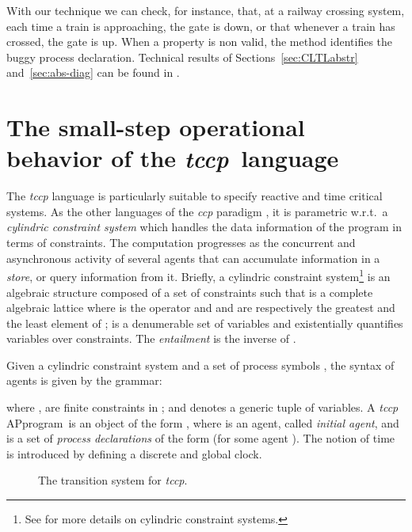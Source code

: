 \documentclass[american]{new_tlp}
\makeatletter
\providecommand{\ifempty}[3]{\def\@@@temp{#1}\ifx\@@@temp\@empty#2\else#3\fi}
\newcommand*{\ccp}{\textit{ccp}}
\newcommand*{\progrule}{process declaration}
\newcommand*{\query}[1][A]{\ifempty{#1}{P}{p}rogram}
\newcommand*{\tccp}{\textit{tccp}}
\providecommand*{\wrt}  {w.r.t.}
\makeatother
\begin{document}
With our technique we can check, for instance, that, at a railway crossing
system, each time a train is approaching, the gate is down, or that
whenever a train has crossed, the gate is up.  When a property is non
valid, the method identifies the buggy \progrule.  Technical results of
Sections~\ref{sec:CLTLabstr} and~\ref{sec:abs-diag} can be found in
\cite{CominiTV14-techrep}.


\section{The small-step operational behavior of the \tccp\ language}
\label{sec:Sem}

The \tccp{} language \cite{deBoerGM99} is particularly suitable to specify
reactive and time critical systems.  As the other languages of the \ccp{}
paradigm \cite{Saraswat93}, it is parametric \wrt\ a \emph{cylindric
constraint system} which handles the data information of the program in
terms of constraints.  The computation progresses as the concurrent and
asynchronous activity of several agents that can accumulate information in
a \emph{store}, or query information from it.  Briefly, a cylindric
constraint system\footnote{See \cite{deBoerGM99,Saraswat93} for more
details on cylindric constraint systems.} is an algebraic structure  composed of a set of constraints
 such that  is a complete algebraic lattice
where  is the  operator and  and  are
respectively the greatest and the least element of ;  is a
denumerable set of variables and  existentially quantifies
variables over constraints.  The \emph{entailment}  is the inverse
of .


Given a cylindric constraint system  and a set of process symbols
, the syntax of agents is given by the grammar:

where ,  are finite constraints in ; 
and  denotes a generic tuple of  variables.  A \tccp{} \query\
is an object of the form , where  is an agent, called
\emph{initial agent}, and  is a set of \emph{process declarations} of
the form  (for some agent ).  The notion of time is
introduced by defining a discrete and global clock.
\begin{figure}[t]
    \begin{minipage}{\textwidth}
        {\footnotesize
        {\setlength{\jot}{1.5ex}
        
        }
        }
        \caption[The transition system for \tccp{}.]{The transition system for \tccp{}.\footnotemark{}}
        \label{fig:op_sem}
    \end{minipage}
\end{figure}
\end{document}
